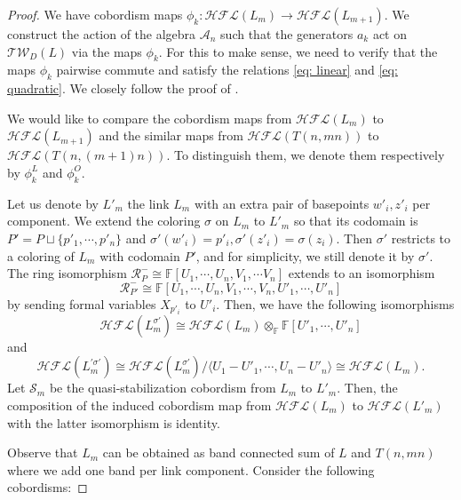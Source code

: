 \documentclass[10pt,a4paper]{amsart}
\theoremstyle{plain}
\newcommand{\CA}{\mathcal{A}}
\newcommand{\Tw}{\mathcal{TW}}
\newcommand{\cHFL}{\mathcal{H\!F\! L}}
\newcommand{\F}{\mathbb{F}}
\begin{document}
\begin{proof}
We have cobordism maps $\phi_k:\cHFL(L_m)\to \cHFL(L_{m+1})$. We construct the action of the algebra $\CA_n$ such that the generators $a_k$ act on $\Tw_D(L)$ via the maps $\phi_k$. For this to make sense, we need to verify that the maps $\phi_k$ pairwise commute and satisfy the relations \eqref{eq: linear} and \eqref{eq: quadratic}. 
We closely follow the proof of \cite[Proposition 3.13]{AGL}. 

We would like to compare the cobordism maps from $\cHFL(L_m)$ to $\cHFL(L_{m+1})$ and the similar maps from $\cHFL(T(n,mn))$ to $\cHFL(T(n,(m+1)n))$. To distinguish them, we denote them respectively by $\phi_k^{L}$ and $\phi_k^{O}$. %

Let us denote by $L'_{m}$ the link $L_{m}$ with an extra pair of basepoints $w'_i,z'_i$ per component. We extend the coloring $\sigma$ on $L_{m}$ to $L'_{m}$ so that its codomain is $P'=P\sqcup \{p'_1, \cdots, p'_n\}$
and $\sigma'(w'_i)=p'_i, \sigma'(z'_i)=\sigma(z_i)$.
Then $\sigma'$ restricts to a coloring of $L_{m}$ with codomain $P'$, and for simplicity, we still denote it by $\sigma'$. The ring isomorphism $\mathcal{R}_P^-\cong \F[U_1, \cdots, U_n, V_1, \cdots V_n]$ extends to an isomorphism 
$$\mathcal{R}_{P'}^-\cong \F[U_1, \cdots, U_n, V_1, \cdots, V_n, U'_1, \cdots , U'_n]$$
by sending formal variables $X_{p'_i}$ to $U'_i$. Then, we have the following isomorphisms
$$\cHFL(L_m^{\sigma'})\cong \cHFL(L_m)\otimes_{\F} \F[U'_1, \cdots, U'_n] $$
and 
$$\cHFL(L_m^{'\sigma'})\cong \cHFL(L_m^{\sigma'})/ \langle U_1-U'_1, \cdots, U_n-U'_n\rangle \cong \cHFL(L_m).$$
Let $\mathcal{S}_m$ be the quasi-stabilization cobordism from $L_m$ to $L'_{m}$. Then, the composition of the induced cobordism map from $\cHFL(L_m)$ to $\cHFL(L'_m)$ with the latter isomorphism is identity.






Observe that $L_m$ can be obtained as band connected sum of $L$ and $T(n,mn)$ where we add one band per link component. Consider the following cobordisms: 


\end{proof}
\end{document}

